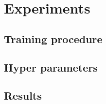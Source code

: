 \chapter{Experiments}
\label{chap:chap6}


\section{Training procedure}
\section{Hyper parameters}
\section{Results}


